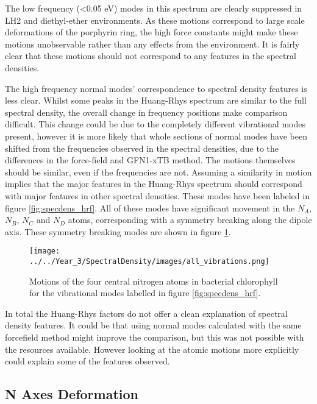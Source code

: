 The low frequency (<0.05 eV) modes in this spectrum are clearly suppressed in LH2
and diethyl-ether environments. As these motions correspond to large scale deformations 
of the porphyrin ring, the high force constants might make these motions unobservable
rather than any effects from the environment. It is fairly clear that these motions
should not correspond to any features in the spectral densities.

The high frequency normal modes' correspondence to spectral density features is 
less clear. Whilst some peaks in the Huang-Rhys spectrum are similar to the full 
spectral density, the overall change in frequency positions make comparison difficult. 
This change could be due to the completely different vibrational modes present, 
however it is more likely that whole sections of normal modes have been shifted 
from the frequencies observed in the spectral densities, due to the differences 
in the force-field and GFN1-xTB method. The motions themselves should be similar,
even if the frequencies are not. Assuming a similarity in motion implies that the
major features in the Huang-Rhys spectrum should correspond with major features 
in other spectral densities. These modes have been labeled in figure \ref{fig:specdens_hrf}.
All of these modes have significant movement in the $N_A$, $N_B$, $N_C$ and $N_D$ 
atoms, corresponding with a symmetry breaking along the \Qy dipole axis. These 
symmetry breaking modes are shown in figure \ref{fig:hrf_vibrations}.

\begin{figure}
    \centering
    \texttt{[image: ../../Year\_3/SpectralDensity/images/all\_vibrations.png]}
    \caption{Motions of the four central nitrogen atoms in bacterial chlorophyll
    for the vibrational modes labelled in figure \ref{fig:specdens_hrf}.}
    \label{fig:hrf_vibrations}
\end{figure}

In total the Huang-Rhys factors do not offer a clean explanation of spectral density
features. It could be that using normal modes calculated with the same forcefield
method might improve the comparison, but this was not possible with the resources
available. However looking at the atomic motions more explicitly could explain some
of the features observed.

\subsection{N Axes Deformation}
\label{subsec:N_axes_deformation}

